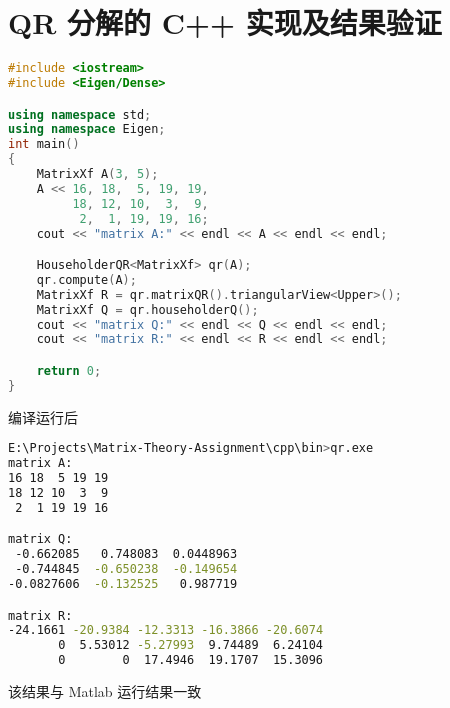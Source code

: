 \section{QR 分解的 C++ 实现及结果验证}
\begin{lstlisting}[language=C++]  
#include <iostream>
#include <Eigen/Dense>

using namespace std;
using namespace Eigen;
int main()
{
    MatrixXf A(3, 5);
    A << 16, 18,  5, 19, 19, 
         18, 12, 10,  3,  9, 
          2,  1, 19, 19, 16;
    cout << "matrix A:" << endl << A << endl << endl;

    HouseholderQR<MatrixXf> qr(A);
    qr.compute(A);
    MatrixXf R = qr.matrixQR().triangularView<Upper>();
    MatrixXf Q = qr.householderQ();
    cout << "matrix Q:" << endl << Q << endl << endl;
    cout << "matrix R:" << endl << R << endl << endl;

    return 0;
}    
\end{lstlisting}

编译运行后
\begin{lstlisting}[language=bash]  
E:\Projects\Matrix-Theory-Assignment\cpp\bin>qr.exe
matrix A:
16 18  5 19 19
18 12 10  3  9
 2  1 19 19 16

matrix Q:
 -0.662085   0.748083  0.0448963
 -0.744845  -0.650238  -0.149654
-0.0827606  -0.132525   0.987719

matrix R:
-24.1661 -20.9384 -12.3313 -16.3866 -20.6074
       0  5.53012 -5.27993  9.74489  6.24104
       0        0  17.4946  19.1707  15.3096
\end{lstlisting}
该结果与 Matlab 运行结果一致